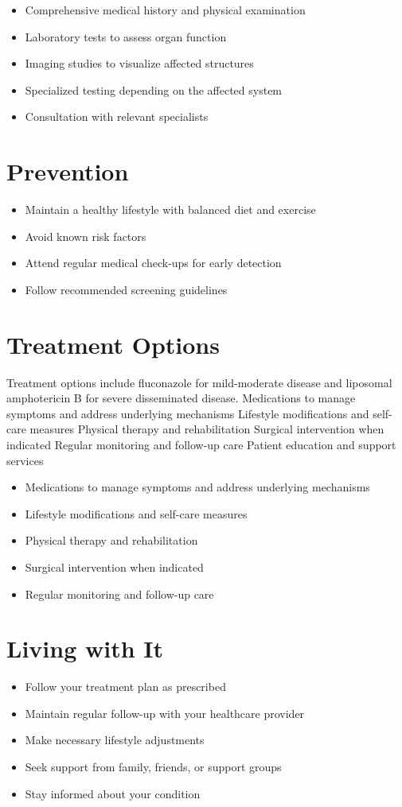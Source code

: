 \begin{itemize}[noitemsep]
  \item Comprehensive medical history and physical examination
  \item Laboratory tests to assess organ function
  \item Imaging studies to visualize affected structures
  \item Specialized testing depending on the affected system
  \item Consultation with relevant specialists
\end{itemize}
\section{Prevention}
\begin{itemize}[noitemsep]
  \item Maintain a healthy lifestyle with balanced diet and exercise
  \item Avoid known risk factors
  \item Attend regular medical check-ups for early detection
  \item Follow recommended screening guidelines
\end{itemize}
\section{Treatment Options}
Treatment options include fluconazole for mild-moderate disease and liposomal amphotericin B for severe disseminated disease. Medications to manage symptoms and address underlying mechanisms Lifestyle modifications and self-care measures Physical therapy and rehabilitation Surgical intervention when indicated Regular monitoring and follow-up care Patient education and support services

\begin{itemize}[noitemsep]
  \item Medications to manage symptoms and address underlying mechanisms
  \item Lifestyle modifications and self-care measures
  \item Physical therapy and rehabilitation
  \item Surgical intervention when indicated
  \item Regular monitoring and follow-up care
\end{itemize}
\section{Living with It}
\begin{itemize}[noitemsep]
  \item Follow your treatment plan as prescribed
  \item Maintain regular follow-up with your healthcare provider
  \item Make necessary lifestyle adjustments
  \item Seek support from family, friends, or support groups
  \item Stay informed about your condition
\end{itemize}

